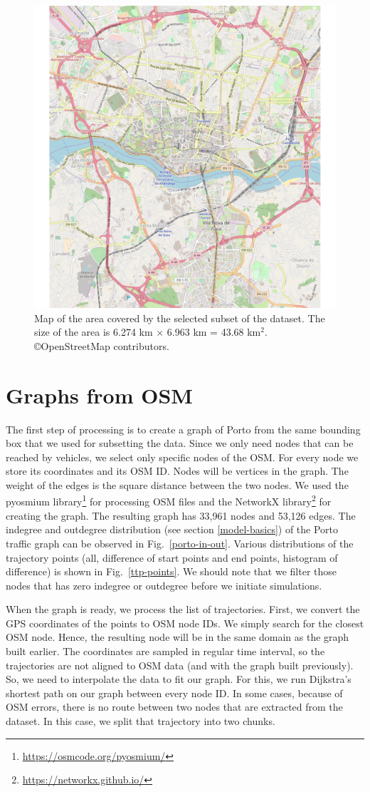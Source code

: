 \documentclass[b5paper,12pt]{report}
\theoremstyle{definition}
\begin{document}
\begin{figure}[t!]
\centering
\includegraphics[width = .7\textwidth]{img/pkdd15_map_subset.pdf}
\caption{Map of the area covered by the selected subset of the dataset. The size of the area is 6.274 km $\times$ 6.963 km = 43.68 km$^2$. \copyright OpenStreetMap contributors.}
\label{porto-map}
\end{figure}
\section{Graphs from OSM}
\label{OSM-graph}

The first step of processing is to create a graph of Porto from the same bounding box that we used for subsetting the data. Since we only need nodes that can be reached by vehicles, we select only specific nodes of the OSM. For every node we store its coordinates and its OSM ID. Nodes will be vertices in the graph. The weight of the edges is the square distance between the two nodes. We used the pyosmium library\footnote{\url{https://osmcode.org/pyosmium/}} for processing OSM files and the NetworkX library\footnote{\url{https://networkx.github.io/}} for creating the graph. The resulting graph has 33,961 nodes and 53,126 edges. The indegree and outdegree distribution (see section \ref{model-basics}) of the Porto traffic graph can be observed in Fig.~\ref{porto-in-out}. Various distributions of the trajectory points (all, difference of start points and end points, histogram of difference) is shown in Fig.~\ref{ttp-points}. We should note that we filter those nodes that has zero indegree or outdegree before we initiate simulations.

When the graph is ready, we process the list of trajectories. First, we convert the GPS coordinates of the points to OSM node IDs. We simply search for the closest OSM node. Hence, the resulting node will be in the same domain as the graph built earlier. The coordinates are sampled in regular time interval, so the trajectories are not aligned to OSM data (and with the graph built previously). So, we need to interpolate the data to fit our graph. For this, we run Dijkstra's shortest path on our graph between every node ID. In some cases, because of OSM errors, there is no route between two nodes that are extracted from the dataset. In this case, we split that trajectory into two chunks. 
\end{document}
